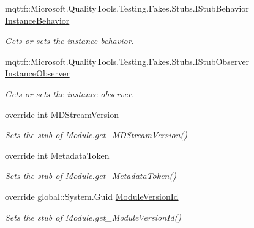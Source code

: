 \begin{DoxyCompactItemize}
mqttf\-::\-Microsoft.\-Quality\-Tools.\-Testing.\-Fakes.\-Stubs.\-I\-Stub\-Behavior \hyperlink{class_system_1_1_reflection_1_1_fakes_1_1_stub_module_a99800f33c4aa50c26d473d96f26e3731}{Instance\-Behavior}
\begin{DoxyCompactList}\small\item\em Gets or sets the instance behavior.\end{DoxyCompactList}\item 
mqttf\-::\-Microsoft.\-Quality\-Tools.\-Testing.\-Fakes.\-Stubs.\-I\-Stub\-Observer \hyperlink{class_system_1_1_reflection_1_1_fakes_1_1_stub_module_a150c4f458ed6718637a8130554e6dcdb}{Instance\-Observer}
\begin{DoxyCompactList}\small\item\em Gets or sets the instance observer.\end{DoxyCompactList}\item 
override int \hyperlink{class_system_1_1_reflection_1_1_fakes_1_1_stub_module_a4605d0e60f4a766e69b22aaf2a8e6cd1}{M\-D\-Stream\-Version}
\begin{DoxyCompactList}\small\item\em Sets the stub of Module.\-get\-\_\-\-M\-D\-Stream\-Version()\end{DoxyCompactList}\item 
override int \hyperlink{class_system_1_1_reflection_1_1_fakes_1_1_stub_module_a67c17026856c2eebba8f8a9c674fac74}{Metadata\-Token}
\begin{DoxyCompactList}\small\item\em Sets the stub of Module.\-get\-\_\-\-Metadata\-Token()\end{DoxyCompactList}\item 
override global\-::\-System.\-Guid \hyperlink{class_system_1_1_reflection_1_1_fakes_1_1_stub_module_a929824d7f65f222ebfc55f4ae8ec0aec}{Module\-Version\-Id}
\begin{DoxyCompactList}\small\item\em Sets the stub of Module.\-get\-\_\-\-Module\-Version\-Id()\end{DoxyCompactList}\item 

\end{DoxyCompactItemize}
